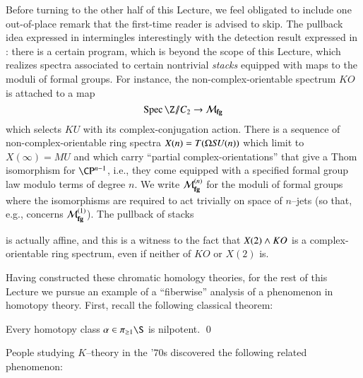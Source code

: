 \begin{remark}\label{RemovingStackinessFromSpectra}
Before turning to the other half of this Lecture, we feel obligated to include one out-of-place remark that the first-time reader is advised to skip.  The pullback idea expressed in  intermingles interestingly with the detection result expressed in : there is a certain program, which is beyond the scope of this Lecture, which realizes spectra associated to certain nontrivial \emph{stacks} equipped with maps to the moduli of formal groups.  For instance, the non-complex-orientable spectrum $KO$ is attached to a map \[\Spec \Z \mmod C_2 \to \moduli{fg}\] which selects $KU$ with its complex-conjugation action.  There is a sequence of non-complex-orientable ring spectra $X(n) = T(\Omega \mathit{SU}(n))$ which limit to $X(\infty) = MU$ and which carry ``partial complex-orientations'' that give a Thom isomorphism for $\CP^{n-1}$, i.e., they come equipped with a specified formal group law modulo terms of degree $n$.  We write $\mathcal{M}_{\mathbf{fg}}^{(n)}$ for the moduli of formal groups where the isomorphisms are required to act trivially on space of $n$--jets (so that, e.g.,  concerns $\mathcal{M}_{\mathbf{fg}}^{(1)}$).  The pullback of stacks
\begin{center}
\end{center}
is actually affine, and this is a witness to the fact that $X(2) \wedge KO$ is a complex-orientable ring spectrum, even if neither of $KO$ or $X(2)$ is.
\end{remark}

Having constructed these chromatic homology theories, for the rest of this Lecture we pursue an example of a ``fiberwise'' analysis of a phenomenon in homotopy theory.  First, recall the following classical theorem:

\begin{theorem}
Every homotopy class $\alpha \in \pi_{\ge 1} \S$ is nilpotent. \qed
\end{theorem}

\noindent People studying $K$--theory in the '$70$s discovered the following related phenomenon:

